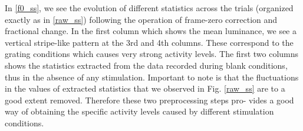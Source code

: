 In \ref{f0_ss}, we see the evolution of different statistics across the
trials (organized exactly as in \ref{raw_ss}) following the operation of
frame-zero correction and fractional change. In the first column which
shows the mean luminance, we see a vertical stripe-like pattern at the 3rd
and 4th columns. These correspond to the grating conditions which causes
very strong activity levels. The first two columns shows the statistics
extracted from the data recorded during blank conditions, thus in the
absence of any stimulation. Important to note is that the fluctuations in
the values of extracted statistics that we observed in Fig. \ref{raw_ss}
are to a good extent removed. Therefore these two preprocessing steps
pro- \linebreak
\newpage
vides a good way of obtaining the specific activity levels caused by
different stimulation conditions.
